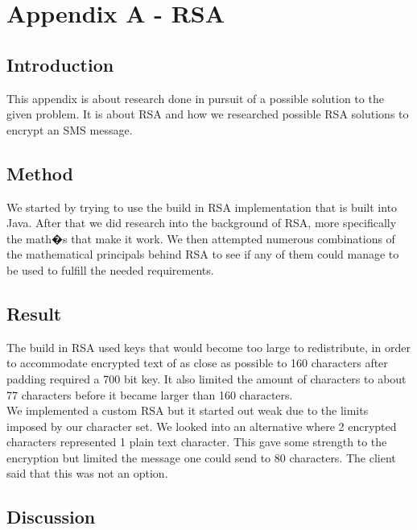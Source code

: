 \section{Appendix A - RSA}

\subsection*{Introduction}

This appendix is about research done in pursuit of a possible solution to the given problem. It is about RSA and how we researched possible RSA solutions to encrypt an SMS message.

\subsection*{Method}

We started by trying to use the build in RSA implementation that is built into Java. After that we did research into the background of RSA, more specifically the math�s that make it work. We then attempted numerous combinations of the mathematical principals behind RSA to see if any of them could manage to be used to fulfill the needed requirements.

\subsection*{Result}

The build in RSA used keys that would become too large to redistribute, in order to accommodate encrypted text of as close as possible to 160 characters after padding required a 700 bit key. It also limited the amount of characters to about 77 characters before it became larger than 160 characters.
\vspace{10pt}\\
We implemented a custom RSA but it started out weak due to the limits imposed by our character set. We looked into an alternative where 2 encrypted characters represented 1 plain text character. This gave some strength to the encryption but limited the message one could send to 80 characters. The client said that this was not an option.

\subsection*{Discussion}

